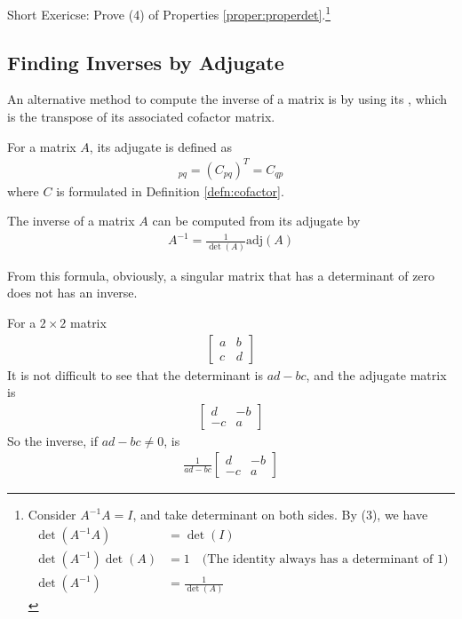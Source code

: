 Short Exericse: Prove (4) of Properties \ref{proper:properdet}.\footnote{Consider $A^{-1}A=I$, and take determinant on both sides. By (3), we have
\begin{align*}
\det(A^{-1}A) &= \det(I) \\
\det(A^{-1})\det(A) &= 1 \quad \text{(The identity always has a determinant of $1$)} \\
\det(A^{-1}) &= \frac{1}{\det(A)}
\end{align*}}

\subsection{Finding Inverses by Adjugate}
An alternative method to compute the inverse of a matrix is by using its , which is the transpose of its associated cofactor matrix.
\begin{defn}[Adjugate]
For a matrix $A$, its adjugate is defined as
\begin{align*}
[\text{adj}(A)]_{pq} = (C_{pq})^{T} = C_{qp}
\end{align*}
where $C$ is formulated in Definition \ref{defn:cofactor}.
\end{defn}
\begin{proper}
\label{proper:invadj}
The inverse of a matrix $A$ can be computed from its adjugate by
\begin{align*}
A^{-1} = \frac{1}{\det(A)}\text{adj}(A)
\end{align*}
\end{proper}
From this formula, obviously, a singular matrix that has a determinant of zero does not has an inverse.
\begin{exmp}
\label{ex:2x2}
For a $2 \times 2$ matrix
\begin{align*}
\begin{bmatrix}
a & b \\
c & d
\end{bmatrix}    
\end{align*}
It is not difficult to see that the determinant is $ad - bc$, and the adjugate matrix is
\begin{align*}
\begin{bmatrix}
d & -b \\
-c & a 
\end{bmatrix}    
\end{align*}
So the inverse, if $ad - bc \neq 0$, is
\begin{align*}
\frac{1}{ad-bc}
\begin{bmatrix}
d & -b \\
-c & a 
\end{bmatrix}
\end{align*}
\end{exmp}
